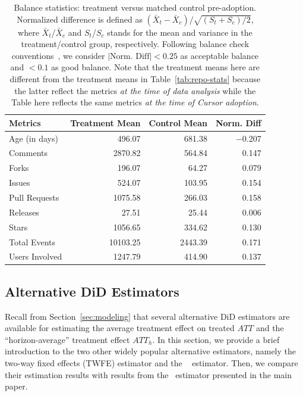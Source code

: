 \begin{table}
    \centering
    \small
    \caption{Balance statistics: treatment versus matched control pre-adoption. Normalized difference is defined as $(\bar X_{t} - \bar X_{c})/{\sqrt{(S_t+S_c) / 2}}$, where $\bar X_{t}$/$\bar X_c$ and $S_{t}$/$S_c$ stands for the mean and variance in the treatment/control group, respectively. Following balance check conventions~\cite{austin2009balance, stuart2013prognostic}, we consider $|\text{Norm. Diff}| < 0.25$ as acceptable balance and  $< 0.1$ as good balance.
    Note that the treatment means here are different from the treatment means in Table~\ref{tab:repo-stats} because the latter reflect the metrics \emph{at the time of data analysis} while the Table here reflects the same metrics \emph{at the time of Cursor adoption}.}
    \label{tab:balance-check}
    \begin{tabular}{lrrr}
    \toprule
    Metrics & Treatment Mean & Control Mean & Norm. Diff \\
    \midrule
    Age (in days)       & 496.07   & 681.38  & $-$0.207 \\
    Comments     & 2870.82  & 564.84  & 0.147 \\
    Forks        & 196.07   & 64.27   & 0.079 \\
    Issues       & 524.07   & 103.95  & 0.154 \\
    Pull Requests        & 1075.58  & 266.03  & 0.158 \\
    Releases     & 27.51    & 25.44   & 0.006 \\
    Stars        & 1056.65  & 334.62  & 0.130 \\
    Total Events   & 10103.25 & 2443.39 & 0.171 \\
    Users Involved & 1247.79  & 414.90  & 0.137 \\
    \bottomrule
    \end{tabular}
\end{table}

\subsection{Alternative DiD Estimators}
\label{sec:appendix-alternative-estimators}

Recall from Section~\ref{sec:modeling} that several alternative DiD estimators are available for estimating the average treatment effect on treated $ATT$ and the ``horizon-average'' treatment effect $ATT_h$.
In this section, we provide a brief introduction to the two other widely popular alternative estimators, namely the two-way fixed effects (TWFE) estimator and the ~\citet{callaway2021difference} estimator.
Then, we compare their estimation results with results from the~\citet{borusyak2024revisiting} estimator presented in the main paper.

